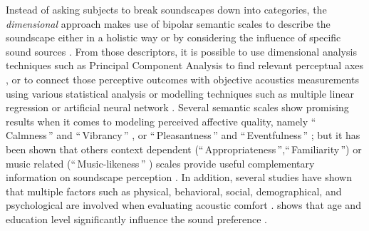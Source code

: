\documentclass[twoside,twocolumn]{article}
\begin{document}
Instead of asking subjects to break soundscapes down into categories, the \textit{dimensional} approach makes use of bipolar semantic scales to describe the soundscape either in a holistic way \cite{jeon2013soundwalk, kang_semantic_2010, cain_development_2013, torija2013application} or by considering the influence of specific sound sources \cite{guyot2005urban, lavandier2006contribution, ricciardi2015sound}. From those descriptors, it is possible to use dimensional analysis techniques such as Principal Component Analysis to find relevant perceptual axes \cite{cain_development_2013}, or to connect those perceptive outcomes with objective acoustics measurements using various statistical analysis or modelling techniques such as multiple linear regression \cite{lavandier2006contribution,ricciardi2015sound} or artificial neural network \cite{yu2009modeling}. Several semantic scales show promising results when it comes to modeling perceived affective quality, namely ``\,Calmness\,'' and ``\,Vibrancy\,'' \cite{cain_development_2013, axelsson2010principal}, or ``\,Pleasantness\,'' and ``\,Eventfulness\,'' \cite{axelsson2010principal}; but it has been shown that others context dependent (``\,Appropriateness\,'',``\,Familiarity\,'') or music related (``\,Music-likeness\,'' ) scales provide useful complementary information on soundscape perception \cite{aletta2016soundscape}. In addition, several studies have shown that multiple factors such as physical, behavioral, social, demographical, and psychological are involved when evaluating acoustic comfort \cite{marquis2005noise, yu2009modeling}.  \cite{yu2010factors} shows that age and education level significantly influence the sound preference  .
 
\end{document}
